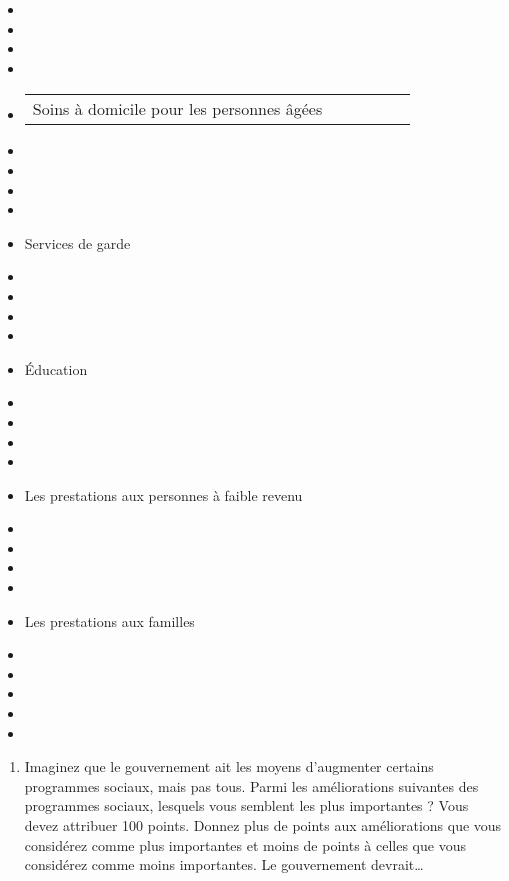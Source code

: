 \documentclass[
  letterpaper,
  DIV=11,
  numbers=noendperiod]{scrreprt}
\providecommand{\tightlist}{%
  \setlength{\itemsep}{0pt}\setlength{\parskip}{0pt}}\usepackage{longtable,booktabs,array}
\begin{document}
\begin{itemize}
\item
\item
\item
\item
\item
  \begin{longtable}[]{@{}llllll@{}}
  \toprule\noalign{}
  \endhead
  \bottomrule\noalign{}
  \endlastfoot
  Soins à domicile pour les personnes âgées & & & & & \\
  \end{longtable}
\item
\item
\item
\item
\item
  \hfill\break
  Services de garde \textbar{}
\item
\item
\item
\item
\item
  \hfill\break
  Éducation \textbar{}
\item
\item
\item
\item
\item
  \hfill\break
  Les prestations aux personnes à faible revenu \textbar{}
\item
\item
\item
\item
\item
  \hfill\break
  Les prestations aux familles \textbar{}
\item
\item
\item
\item
\item
\end{itemize}

\begin{enumerate}
\def\labelenumi{\arabic{enumi}.}
\setcounter{enumi}{60}
\tightlist
\item
  Imaginez que le gouvernement ait les moyens d'augmenter certains
  programmes sociaux, mais pas tous. Parmi les améliorations suivantes
  des programmes sociaux, lesquels vous semblent les plus importantes ?
  Vous devez attribuer 100 points. Donnez plus de points aux
  améliorations que vous considérez comme plus importantes et moins de
  points à celles que vous considérez comme moins importantes. Le
  gouvernement devrait\ldots{}
\end{enumerate}
\end{document}
